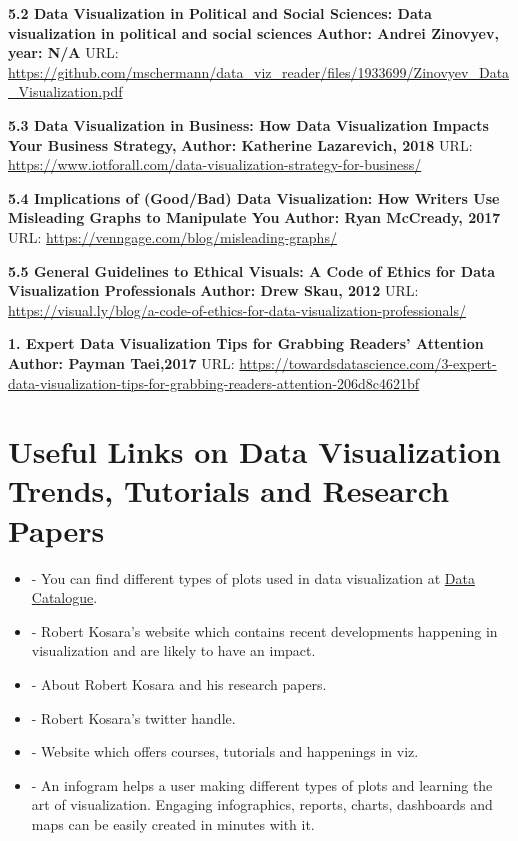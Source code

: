 \documentclass[]{book}
\providecommand{\tightlist}{%
  \setlength{\itemsep}{0pt}\setlength{\parskip}{0pt}}
\theoremstyle{definition}
\theoremstyle{definition}
\theoremstyle{definition}
\theoremstyle{remark}
\begin{document}
\textbf{5.2 Data Visualization in Political and Social Sciences: Data
visualization in political and social sciences} \textbf{Author: Andrei
Zinovyev, year: N/A} URL:
\url{https://github.com/mschermann/data_viz_reader/files/1933699/Zinovyev_Data_Visualization.pdf}

\textbf{5.3 Data Visualization in Business: How Data Visualization
Impacts Your Business Strategy,} \textbf{Author: Katherine Lazarevich,
2018} URL:
\url{https://www.iotforall.com/data-visualization-strategy-for-business/}

\textbf{5.4 Implications of (Good/Bad) Data Visualization: How Writers
Use Misleading Graphs to Manipulate You} \textbf{Author: Ryan McCready,
2017} URL: \url{https://venngage.com/blog/misleading-graphs/}

\textbf{5.5 General Guidelines to Ethical Visuals: A Code of Ethics for
Data Visualization Professionals} \textbf{Author: Drew Skau, 2012} URL:
\url{https://visual.ly/blog/a-code-of-ethics-for-data-visualization-professionals/}

\textbf{1. Expert Data Visualization Tips for Grabbing Readers'
Attention} \textbf{Author: Payman Taei,2017} URL:
\url{https://towardsdatascience.com/3-expert-data-visualization-tips-for-grabbing-readers-attention-206d8c4621bf}

\section{Useful Links on Data Visualization Trends, Tutorials and
Research
Papers}\label{useful-links-on-data-visualization-trends-tutorials-and-research-papers}

\begin{itemize}
\tightlist
\item
  \citep{charts_viz} - You can find different types of plots used in
  data visualization at
  \href{https://datavizcatalogue.com/search.html}{Data Catalogue}.
\item
  \citep{eagereyes_viz} - Robert Kosara's website which contains recent
  developments happening in visualization and are likely to have an
  impact.
\item
  \citep{research_viz} - About Robert Kosara and his research papers.
\item
  \citep{twitter_Kosara} - Robert Kosara's twitter handle.
\item
  \citep{flowingdata} - Website which offers courses, tutorials and
  happenings in viz.
\item
  \citep{infogram} - An infogram helps a user making different types of
  plots and learning the art of visualization. Engaging infographics,
  reports, charts, dashboards and maps can be easily created in minutes
  with it.
\end{itemize}
\end{document}
